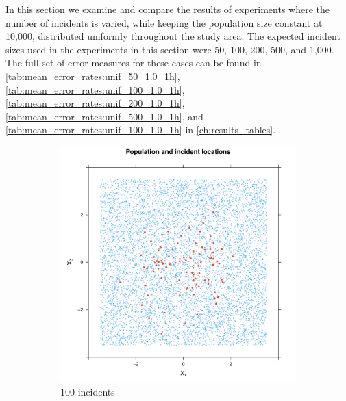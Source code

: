 In this section we examine and compare the results of experiments where the number of incidents is varied, while keeping the population size constant at 10,000, distributed uniformly throughout the study area.
The expected incident sizes used in the experiments in this section were 50, 100, 200, 500, and 1,000.
The full set of error measures for these cases can be found in \autoref{tab:mean_error_rates:unif_50_1.0_1h}, \autoref{tab:mean_error_rates:unif_100_1.0_1h}, \autoref{tab:mean_error_rates:unif_200_1.0_1h}, \autoref{tab:mean_error_rates:unif_500_1.0_1h}, and \autoref{tab:mean_error_rates:unif_100_1.0_1h} in \autoref{ch:results_tables}.


\begin{figure}[htbp]
    \centering
    \begin{subfigure}{0.45\textwidth}
    \includegraphics[width=\textwidth]{results/unif_100_1.0_1h/output/population_and_incidents_scatter}
    \caption{100 incidents}
    \end{subfigure}
    \begin{subfigure}{0.45\textwidth}

\end{subfigure}
\end{figure}
